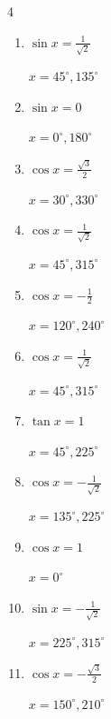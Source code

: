 \begin{multicols}{4}
\begin{enumerate}
        $\displaystyle x = 60^{\circ} , 300^{\circ}$

  \item $\displaystyle \sin{x}  = \frac{1}{\sqrt{2}}$

        $\displaystyle x = 45^{\circ} , 135^{\circ}$

  \item $\displaystyle \sin{x}  = 0$

        $\displaystyle x = 0^{\circ} , 180^{\circ}$

  \item $\displaystyle \cos{x}  = \frac{\sqrt{3}}{2}$

        $\displaystyle x = 30^{\circ} , 330^{\circ}$

  \item $\displaystyle \cos{x}  = \frac{1}{\sqrt{2}}$

        $\displaystyle x = 45^{\circ} , 315^{\circ}$

  \item $\displaystyle \cos{x}  = -\frac{1}{2}$

        $\displaystyle x = 120^{\circ} , 240^{\circ}$

  \item $\displaystyle \cos{x}  = \frac{1}{\sqrt{2}}$

        $\displaystyle x = 45^{\circ} , 315^{\circ}$

  \item $\displaystyle \tan{x}  = 1$

        $\displaystyle x = 45^{\circ} , 225^{\circ}$

  \item $\displaystyle \cos{x}  = -\frac{1}{\sqrt{2}}$

        $\displaystyle x = 135^{\circ} , 225^{\circ}$

  \item $\displaystyle \cos{x}  = 1$

        $\displaystyle x = 0^{\circ}$

  \item $\displaystyle \sin{x}  = -\frac{1}{\sqrt{2}}$

        $\displaystyle x = 225^{\circ} , 315^{\circ}$

  \item $\displaystyle \cos{x}  = -\frac{\sqrt{3}}{2}$

        $\displaystyle x = 150^{\circ} , 210^{\circ}$

\columnbreak %


\end{enumerate}
\end{multicols}
